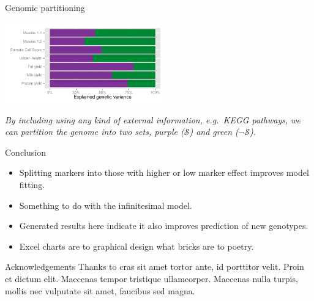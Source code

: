 \documentclass[landscape,a3paper,fontscale=0.75,margin=0.4cm]{baposter}
\begin{document}
\begin{poster}
\begin{posterbox}[name=genome,column=0,below=problem]{Genomic partitioning}
  \begin{center}
    \vspace{0.12in}
  	\includegraphics[page=3,height=1.37in,keepaspectratio=true]{figures}
  	\vspace{0.312in}
  	
  	\itshape{By including using any kind of external information, e.g.\ KEGG pathways, we can partition the genome into two sets, purple ($\mathcal{S}$) and green ($\neg\mathcal{S}$).}
  \end{center}

\end{posterbox}

\begin{posterbox}[name=conclusion,column=1,span=2,row=0]{Conclusion}
    \begin{itemize}
     \item Splitting markers into those with higher or low marker effect improves model fitting.
     \item Something to do with the infinitesimal model.
     \item Generated results here indicate it also improves prediction of new genotypes.
     \item Excel charts are to graphical design what bricks are to poetry.
    \end{itemize}
\end{posterbox}


\begin{posterbox}[name=ack,column=2,below=genome]{Acknowledgements}
   Thanks to cras sit amet tortor ante, id porttitor velit. Proin et dictum elit. Maecenas tempor tristique ullamcorper. 
   Maecenas nulla turpis, mollis nec vulputate sit amet, faucibus sed magna.
   

\end{posterbox}
\end{poster}
\end{document}
